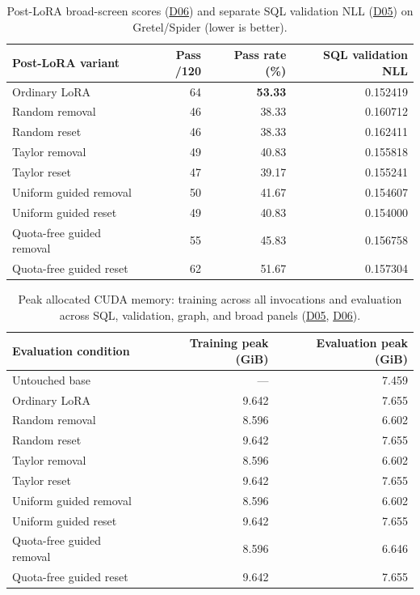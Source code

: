 \documentclass[10pt,letterpaper]{article}
\DeclareRobustCommand{\dataset}[1]{\hyperlink{dataset-#1}{\textnormal{#1}}}
\begin{document}
\begin{table}[htbp]
\centering
\small
\caption{Post-LoRA broad-screen scores (\dataset{D06}) and separate SQL
validation NLL (\dataset{D05}) on Gretel/Spider (lower is better).}
\label{tab:broad-post-lora}
\begin{tabular}{@{}lrrr@{}}
\toprule
Post-LoRA variant & Pass /120 & Pass rate (\%) & SQL validation NLL\\
\midrule
Ordinary LoRA & 64 & \textbf{53.33} & 0.152419\\
Random removal & 46 & 38.33 & 0.160712\\
Random reset & 46 & 38.33 & 0.162411\\
Taylor removal & 49 & 40.83 & 0.155818\\
Taylor reset & 47 & 39.17 & 0.155241\\
Uniform guided removal & 50 & 41.67 & 0.154607\\
Uniform guided reset & 49 & 40.83 & 0.154000\\
Quota-free guided removal & 55 & 45.83 & 0.156758\\
Quota-free guided reset & 62 & 51.67 & 0.157304\\
\bottomrule
\end{tabular}
\end{table}

\begin{table}[htbp]
\centering
\small
\caption{Peak allocated CUDA memory: training across all invocations
and evaluation across SQL, validation, graph, and broad panels
(\dataset{D05}, \dataset{D06}).}
\label{tab:training-memory}
\begin{tabular}{@{}lrr@{}}
\toprule
Evaluation condition & Training peak (GiB) & Evaluation peak (GiB)\\
\midrule
Untouched base & --- & 7.459\\
Ordinary LoRA & 9.642 & 7.655\\
Random removal & 8.596 & 6.602\\
Random reset & 9.642 & 7.655\\
Taylor removal & 8.596 & 6.602\\
Taylor reset & 9.642 & 7.655\\
Uniform guided removal & 8.596 & 6.602\\
Uniform guided reset & 9.642 & 7.655\\
Quota-free guided removal & 8.596 & 6.646\\
Quota-free guided reset & 9.642 & 7.655\\
\bottomrule
\end{tabular}
\end{table}
\end{document}
